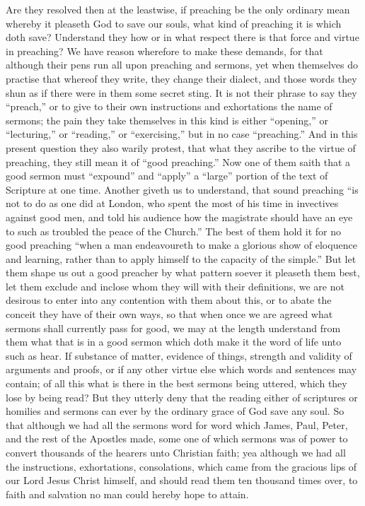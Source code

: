 Are they resolved then at the leastwise, if preaching be the only ordinary mean whereby it pleaseth God to save our souls, what kind of preaching it is which doth save? Understand they how or in what respect there is that force and virtue in preaching? We have reason wherefore to make these demands, for that although their pens run all upon preaching and sermons, yet when themselves do practise that whereof they write, they change their dialect, and those words they shun as if there were in them some secret sting. It is not their phrase to say they “preach,” or to give to their own instructions and exhortations the name of sermons; the pain they take themselves in this kind is either “opening,” or “lecturing,” or “reading,” or “exercising,” but in no case “preaching.”  And in this present question they also warily protest, that what they ascribe to the virtue of preaching, they still mean it of “good preaching.” Now one of them saith that a good sermon must “expound” and “apply” a “large” portion of the text of Scripture at one time. Another giveth us to understand, that sound preaching “is not to do as one did at London, who spent the most of his time in invectives against good men, and told his audience how the magistrate should have an eye to such as troubled the peace of the Church.” The best of them hold it for no good preaching “when a man endeavoureth to make a glorious show of eloquence  and learning, rather than to apply himself to the capacity of the simple.”
But let them shape us out a good preacher by what pattern soever it pleaseth them best, let them exclude and inclose whom they will with their definitions, we are not desirous to enter into any contention with them about this, or to abate the conceit they have of their own ways, so that when once we are agreed what sermons shall currently pass for good, we may at the length understand from them what that is in a good sermon which doth make it the word of life unto such as hear. If substance of matter, evidence of things, strength and validity of arguments and proofs, or if any other virtue else which words and sentences may contain; of all this what is there in the best sermons being uttered, which they lose by being read? But they utterly deny that the reading either of scriptures or homilies and sermons can ever by the ordinary grace of God save any soul. So that although we had all the sermons word for word which James, Paul, Peter, and the rest of the Apostles made, some one of which sermons was of power to convert thousands of the hearers unto Christian faith; yea although we had all the instructions, exhortations, consolations, which came from the gracious lips of our Lord Jesus Christ himself, and should read them ten thousand times over, to faith and salvation no man could hereby hope to attain.
